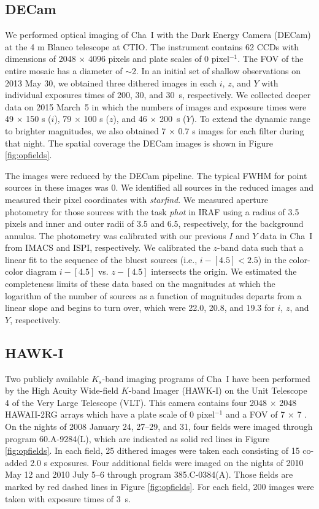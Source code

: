 \documentclass{emulateapj}
\begin{document}
\subsection{DECam}

We performed optical imaging of Cha~I with 
the Dark Energy Camera (DECam) at the 4 m Blanco telescope at CTIO.
The instrument contains 62 CCDs with dimensions of 2048 $\times$ 4096 pixels and 
plate scales of 0 pixel$^{-1}$. 
The FOV of the entire mosaic has a diameter of $\sim$2\arcdeg.
In an initial set of shallow observations on 2013 May 30, 
we obtained three dithered images in each $i$, $z$, and $Y$
with individual exposures times of 200, 30, and 30~s, respectively. 
We collected deeper data on 2015 March~5
in which the numbers of images and exposure times were 49 $\times$ 150 s ($i$), 
79 $\times$ 100 s ($z$), and 46 $\times$ 200~s ($Y$). 
To extend the dynamic range to brighter magnitudes, 
we also obtained 7 $\times$ 0.7 s images for each filter during that night. 
The spatial coverage the DECam images is shown in Figure \ref{fig:opfields}.

The images were reduced by the DECam pipeline.
The typical FWHM for point sources in these images was 0.
We identified all sources in the reduced images and measured their pixel coordinates with {\it starfind}.
We measured aperture photometry for those sources with the task {\it phot} in IRAF 
using a radius of 3.5 pixels and inner and outer radii of 3.5 and 6.5, respectively, for the background 
annulus.
The photometry was calibrated with our previous $I$ and $Y$ data in Cha~I from 
IMACS and ISPI, respectively. 
We calibrated the $z$-band data such that a linear fit
to the sequence of the bluest sources (i.e., $i - [4.5] < 2.5$)
in the color-color diagram $i - [4.5]$ vs. $z - [4.5]$
intersects the origin. 
We estimated the completeness limits of these data based on the magnitudes at which
the logarithm of the number of sources as a function of magnitudes departs from
a linear slope and begins to turn over, which were 22.0, 20.8, and 19.3
for $i$, $z$, and $Y$, respectively. 


\subsection{HAWK-I}

Two publicly available $K_s$-band imaging programs of Cha~I have been
performed by the High Acuity Wide-field $K$-band Imager (HAWK-I)
on the Unit Telescope 4 of the Very Large Telescope (VLT).
This camera contains four 2048 $\times$ 2048 HAWAII-2RG arrays
which have a plate scale of 0 pixel$^{-1}$ 
and a FOV of 7 $\times$ 7 \citep{kiss08}.
On the nights of 2008 January 24, 27--29, and 31, 
four fields were imaged through program 60.A-9284(L), which are indicated as solid red lines in Figure \ref{fig:opfields}.  In each field, 
25 dithered images were taken each consisting of 15 co-added 2.0 s exposures. 
Four additional fields were imaged 
on the nights of 2010 May 12 and 2010 July 5--6 through program 385.C-0384(A).
Those fields are marked by red dashed lines in Figure \ref{fig:opfields}.
For each field, 200 images were taken with exposure times of 3~s. 
\end{document}
